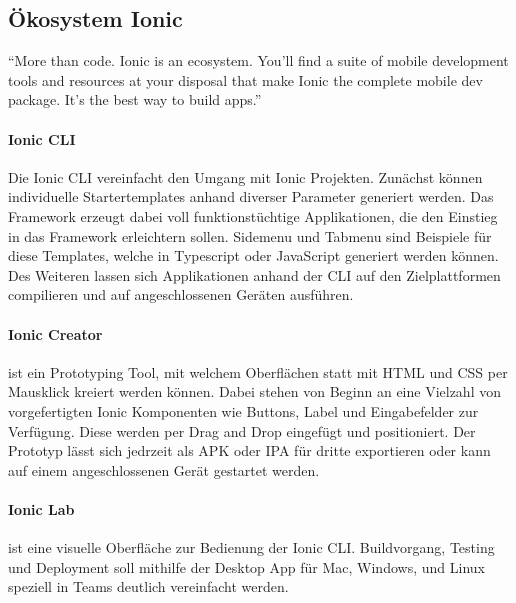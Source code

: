 \vspace{1cm}

\vspace{1cm}


\subsection{Ökosystem Ionic}

``More than code. Ionic is an ecosystem. You'll find a suite of mobile development tools and resources at your disposal that make
Ionic the complete mobile dev package. It's the best way to build apps.'' \cite{Ionic20:online}
\vspace{0.5cm}

\paragraph{Ionic \ac{CLI}}
Die Ionic \ac{CLI} vereinfacht den Umgang mit Ionic Projekten. Zunächst können individuelle
Startertemplates anhand diverser Parameter generiert werden.
Das Framework erzeugt dabei voll funktionstüchtige Applikationen, die den Einstieg in das Framework erleichtern sollen.
Sidemenu und Tabmenu sind Beispiele für diese Templates, welche in Typescript oder JavaScript generiert werden können.
Des Weiteren lassen sich Applikationen anhand der \ac{CLI} auf den Zielplattformen compilieren und auf angeschlossenen Geräten ausführen.

\paragraph{Ionic Creator}
ist ein Prototyping Tool, mit welchem Oberflächen statt
mit HTML und CSS per Mausklick kreiert werden können.
Dabei stehen von Beginn an eine Vielzahl von vorgefertigten Ionic Komponenten wie Buttons,
Label und Eingabefelder zur Verfügung.
Diese werden per Drag and Drop eingefügt und positioniert. Der Prototyp lässt sich jedrzeit
als \ac{APK} oder \ac{IPA} für dritte exportieren oder kann auf einem angeschlossenen Gerät gestartet werden.

\paragraph{Ionic Lab}
ist eine visuelle Oberfläche zur Bedienung der Ionic \ac{CLI}.
Buildvorgang, Testing und Deployment soll mithilfe der Desktop App für Mac, Windows, und
Linux speziell in Teams deutlich vereinfacht werden. \cite{Ionic75:online}

